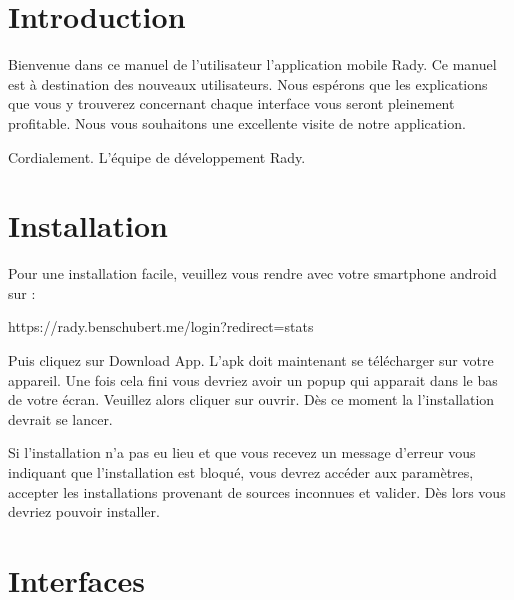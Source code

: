 \documentclass[french]{article}
\begin{document}
	\newpage	
	\section{Introduction}
	Bienvenue dans ce manuel de l’utilisateur l'application mobile Rady. Ce manuel est à destination des nouveaux utilisateurs. Nous espérons que les explications que vous y trouverez concernant chaque interface vous seront pleinement profitable. Nous vous souhaitons une excellente visite de notre application.  
	
	\bigskip
	\bigskip
	
	Cordialement.
	\newline
	L'équipe de développement Rady.
		
	\section{Installation}
	
	Pour une installation facile, veuillez vous rendre avec votre smartphone android sur :
	\bigskip
	
	\centering
	https://rady.benschubert.me/login?redirect=stats
	
	\bigskip
	\justifying 
	Puis cliquez sur Download App. L'apk doit maintenant se télécharger sur votre appareil. Une fois cela fini vous devriez avoir un popup qui apparait dans le bas de votre écran. Veuillez alors cliquer sur ouvrir.
	Dès ce moment la l'installation devrait se lancer.
	\newline
	\newline
	
	Si l'installation n'a pas eu lieu et que vous recevez un message d'erreur vous indiquant que l'installation est bloqué, vous devrez accéder aux paramètres, accepter les installations provenant de sources inconnues et valider. Dès lors vous devriez pouvoir installer.
	
	
	
	\section{Interfaces}
\end{document}
